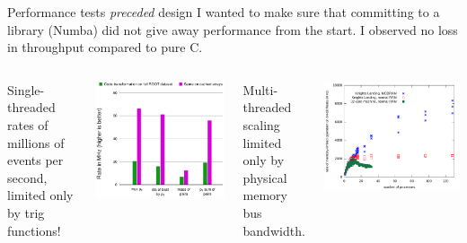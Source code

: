 \documentclass[aspectratio=169]{beamer}
\begin{document}
\begin{frame}{Performance tests {\it preceded} design}
\vspace{0.3 cm}
I wanted to make sure that committing to a library (Numba) did not give away performance from the start. I observed no loss in throughput compared to pure C.

\vspace{0.2 cm}
\begin{columns}[t]
Single-threaded rates of millions of events per second, limited only by trig functions!

\begin{center}
\includegraphics[height=5 cm]{physical-media.pdf}
\end{center}
Multi-threaded scaling limited only by physical memory bus bandwidth.

\vspace{-0.8\baselineskip}
\begin{center}
\includegraphics[height=5 cm]{knl-scaling.pdf}
\end{center}
\end{columns}
\end{frame}
\end{document}
